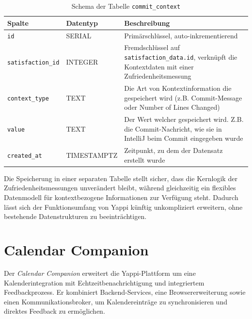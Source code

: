\documentclass[12pt,a4paper]{report}
\begin{document}
\begin{table}[H]
\centering
\begin{tabular}{|l|l|p{8cm}|}
\hline
\textbf{Spalte} & \textbf{Datentyp} & \textbf{Beschreibung} \\
\hline
\texttt{id} & SERIAL & Primärschlüssel, auto-inkrementierend \\ 
\texttt{satisfaction\_id} & INTEGER & Fremdschlüssel auf \texttt{satisfaction\_data.id}, verknüpft die Kontextdaten mit einer 
  Zufriedenheitsmessung \\
\texttt{context\_type} & TEXT & Die Art von Kontextinformation die gespeichert wird (z.B. Commit-Message oder Number of Lines 
  Changed) \\
\texttt{value} & TEXT & Der Wert welcher gespeichert wird. Z.B. die Commit-Nachricht, wie sie in IntelliJ beim Commit eingegeben
  wurde \\
\texttt{created\_at} & TIMESTAMPTZ & Zeitpunkt, zu dem der Datensatz erstellt wurde \\
\hline
\end{tabular}
\caption{Schema der Tabelle \texttt{commit\_context}}
\label{tab:commit_context_schema}
\end{table}

Die Speicherung in einer separaten Tabelle stellt sicher, dass die Kernlogik der Zufriedenheitsmessungen unverändert bleibt,
während gleichzeitig ein flexibles Datenmodell für kontextbezogene Informationen zur Verfügung steht. Dadurch lässt sich der
Funktionsumfang von Yappi künftig unkompliziert erweitern, ohne bestehende Datenstrukturen zu beeinträchtigen.




\section{Calendar Companion}

        Der \textit{Calendar Companion} erweitert die Yappi-Plattform um eine Kalenderintegration mit Echtzeitbenachrichtigung
        und integriertem Feedbackprozess. Er kombiniert Backend-Services, eine Browsererweiterung sowie einen Kommunikationsbroker,
        um Kalendereinträge zu synchronisieren und direktes Feedback zu ermöglichen.
\end{document}

